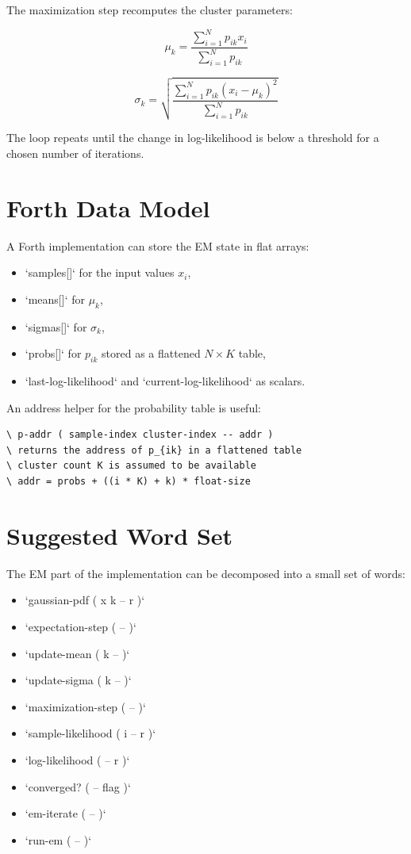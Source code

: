 \documentclass[11pt]{article}
\begin{document}
The maximization step recomputes the cluster parameters:

\begin{equation}
\mu_k = \frac{\sum_{i=1}^{N} p_{ik} x_i}{\sum_{i=1}^{N} p_{ik}}
\end{equation}

\begin{equation}
\sigma_k =
\sqrt{
\frac{\sum_{i=1}^{N} p_{ik}(x_i-\mu_k)^2}{\sum_{i=1}^{N} p_{ik}}
}
\end{equation}

The loop repeats until the change in log-likelihood is below a threshold for a chosen number of iterations.

\section*{Forth Data Model}

A Forth implementation can store the EM state in flat arrays:

\begin{itemize}
\item `samples[]` for the input values $x_i$,
\item `means[]` for $\mu_k$,
\item `sigmas[]` for $\sigma_k$,
\item `probs[]` for $p_{ik}$ stored as a flattened $N \times K$ table,
\item `last-log-likelihood` and `current-log-likelihood` as scalars.
\end{itemize}

An address helper for the probability table is useful:

\begin{lstlisting}
\ p-addr ( sample-index cluster-index -- addr )
\ returns the address of p_{ik} in a flattened table
\ cluster count K is assumed to be available
\ addr = probs + ((i * K) + k) * float-size
\end{lstlisting}

\section*{Suggested Word Set}

The EM part of the implementation can be decomposed into a small set of words:

\begin{itemize}
\item `gaussian-pdf ( x k -- r )`
\item `expectation-step ( -- )`
\item `update-mean ( k -- )`
\item `update-sigma ( k -- )`
\item `maximization-step ( -- )`
\item `sample-likelihood ( i -- r )`
\item `log-likelihood ( -- r )`
\item `converged? ( -- flag )`
\item `em-iterate ( -- )`
\item `run-em ( -- )`
\end{itemize}
\end{document}
